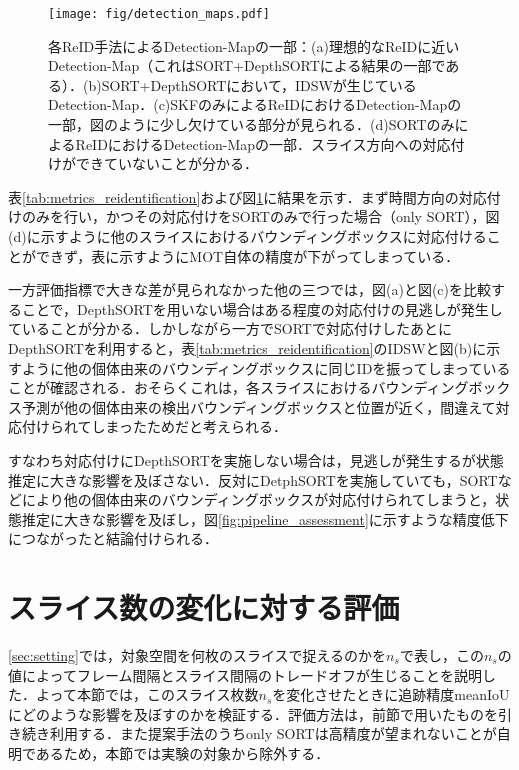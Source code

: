     \begin{figure}[t]
        \centering
        \texttt{[image: fig/detection\_maps.pdf]}
        \caption[各ReID手法によるDetection-Mapの一部]{各ReID手法によるDetection-Mapの一部：(a)理想的なReIDに近いDetection-Map（これはSORT+DepthSORTによる結果の一部である）．(b)SORT+DepthSORTにおいて，IDSWが生じているDetection-Map．(c)SKFのみによるReIDにおけるDetection-Mapの一部，図のように少し欠けている部分が見られる．(d)SORTのみによるReIDにおけるDetection-Mapの一部．スライス方向への対応付けができていないことが分かる．}
        \label{fig:detection_maps}
    \end{figure}

    表\ref{tab:metrics_reidentification}および図\ref{fig:detection_maps}に結果を示す．まず時間方向の対応付けのみを行い，かつその対応付けをSORTのみで行った場合（only SORT），図(d)に示すように他のスライスにおけるバウンディングボックスに対応付けることができず，表に示すようにMOT自体の精度が下がってしまっている．

    一方評価指標で大きな差が見られなかった他の三つでは，図(a)と図(c)を比較することで，DepthSORTを用いない場合はある程度の対応付けの見逃しが発生していることが分かる．しかしながら一方でSORTで対応付けしたあとにDepthSORTを利用すると，表\ref{tab:metrics_reidentification}のIDSWと図(b)に示すように他の個体由来のバウンディングボックスに同じIDを振ってしまっていることが確認される．おそらくこれは，各スライスにおけるバウンディングボックス予測が他の個体由来の検出バウンディングボックスと位置が近く，間違えて対応付けられてしまったためだと考えられる．

    すなわち対応付けにDepthSORTを実施しない場合は，見逃しが発生するが状態推定に大きな影響を及ぼさない．反対にDetphSORTを実施していても，SORTなどにより他の個体由来のバウンディングボックスが対応付けられてしまうと，状態推定に大きな影響を及ぼし，図\ref{fig:pipeline_assessment}に示すような精度低下につながったと結論付けられる．

\section{スライス数の変化に対する評価}
\label{sec:number_of_slice}

\ref{sec:setting}では，対象空間を何枚のスライスで捉えるのかを$n_s$で表し，この$n_s$の値によってフレーム間隔とスライス間隔のトレードオフが生じることを説明した．よって本節では，このスライス枚数$n_s$を変化させたときに追跡精度meanIoUにどのような影響を及ぼすのかを検証する．評価方法は，前節で用いたものを引き続き利用する．また提案手法のうちonly SORTは高精度が望まれないことが自明であるため，本節では実験の対象から除外する．

